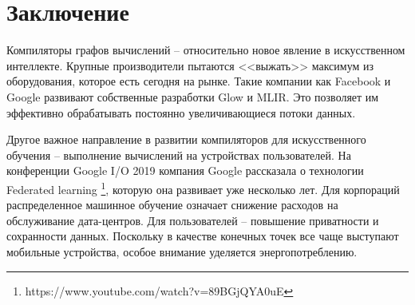 \clearpage
\section{Заключение}

Компиляторы графов вычислений -- относительно новое явление в искусственном
интеллекте. Крупные производители пытаются <<выжать>> максимум из оборудования,
которое есть сегодня на рынке. Такие компании как Facebook и Google развивают
собственные разработки Glow и MLIR. Это позволяет им эффективно обрабатывать
постоянно увеличивающиеся потоки данных.

Другое важное направление в развитии компиляторов для искусственного обучения --
выполнение вычислений на устройствах пользователей. На конференции Google I/O
2019 компания Google рассказала о технологии Federated learning
\footnote{https://www.youtube.com/watch?v=89BGjQYA0uE}, которую она развивает
уже несколько лет. Для корпораций распределенное машинное обучение означает
снижение расходов на обслуживание дата-центров. Для пользователей -- повышение
приватности и сохранности данных. Поскольку в качестве конечных точек
все чаще выступают мобильные устройства, особое внимание уделяется
энергопотреблению.
